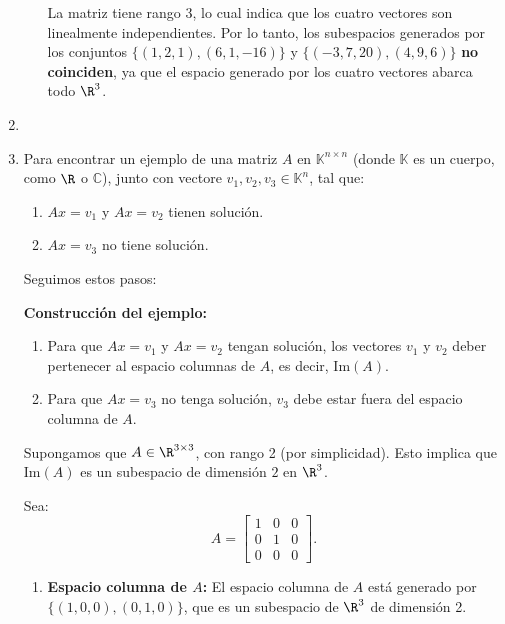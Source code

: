 \begin{enumerate}[label=\color{red}\textbf{\arabic*)}]
\begin{enumerate}[label=\arabic*)]
            La matriz tiene rango 3, lo cual indica que los cuatro vectores son linealmente independientes. Por lo tanto, los subespacios generados por los conjuntos $\{(1,2,1),(6,1,-16)\} $ y $\{(-3,7,20),(4,9,6)\} $ \textbf{no coinciden}, ya que el espacio generado por los cuatro vectores abarca todo $\R^3$. 
            
        \end{enumerate}

\item {}

    \item {}

        
        Para encontrar un ejemplo de una matriz $A$ en $\mathbb{K}^{n\times n}$ (donde $\mathbb{K}$ es un cuerpo, como $\R$ o $\mathbb{C}$), junto con vectore $v_1,v_2,v_3\in \mathbb{K}^n$, tal que:
        \begin{enumerate}[label=\arabic*)]
            \item $Ax=v_1$ y $Ax=v_2$ tienen solución.
            \item $Ax=v_3$ no tiene solución.
        \end{enumerate}
        Seguimos estos pasos:

        \textbf{Construcción del ejemplo:}
        \begin{enumerate}[label=\arabic*)]
            \item Para que $Ax=v_1$ y $Ax=v_2$ tengan solución, los vectores $v_1$ y $v_2$ deber pertenecer al espacio columnas de $A$, es decir,  $\mathrm{Im}(A)$.
            \item Para que $Ax=v_3$ no tenga solución, $v_3$ debe estar fuera del espacio columna de $A$.
        \end{enumerate}

        Supongamos que $A\in \R^{3\times 3}$, con rango 2 (por simplicidad). Esto implica que $\mathrm{Im}(A)$ es un subespacio de dimensión $2$ en  $\R^3$.

        Sea: \[
        A=\begin{bmatrix} 
            1 & 0 & 0\\
            0 & 1 & 0\\
            0 & 0 & 0
        \end{bmatrix} .
        \] 
        \begin{enumerate}[label=\arabic*)]
            \item \textbf{Espacio columna de $A$:} El espacio columna de $A$ está generado por $\{(1,0,0),(0,1,0)\} $, que es un subespacio de $\R^3$ de dimensión 2.


\end{enumerate}
\end{enumerate}
